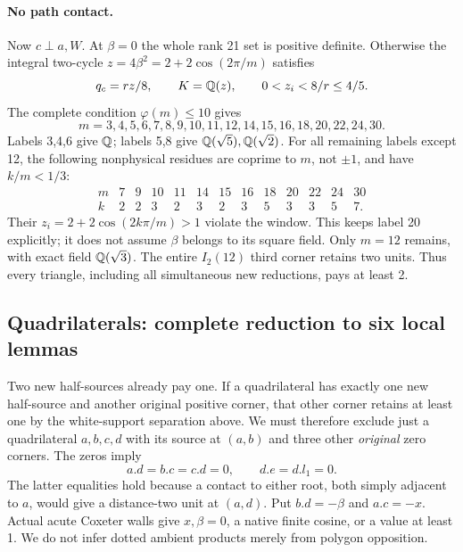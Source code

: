 \paragraph{No path contact.}
Now $c\perp a,W$. At $\beta=0$ the whole rank 21 set is positive
definite. Otherwise the integral two-cycle
$z=4\beta^2=2+2\cos(2\pi/m)$ satisfies
\[
 q_c=rz/8,\qquad K=\mathbb Q(z),\qquad 0<z_i<8/r\le4/5.
\]
The complete condition $\varphi(m)\le10$ gives
\[
 m=3,4,5,6,7,8,9,10,11,12,14,15,16,18,20,22,24,30.
\]
Labels 3,4,6 give $\mathbb Q$; labels 5,8 give
$\mathbb Q(\sqrt5),\mathbb Q(\sqrt2)$. For all remaining labels except 12,
the following nonphysical residues are coprime to $m$, not $\pm1$,
and have $k/m<1/3$:
\[
\begin{array}{c|rrrrrrrrrrrr}
m&7&9&10&11&14&15&16&18&20&22&24&30\\
k&2&2&3&2&3&2&3&5&3&3&5&7.
\end{array}
\]
Their $z_i=2+2\cos(2k\pi/m)>1$ violate the window. This keeps
label 20 explicitly; it does not assume $\beta$ belongs to its
square field. Only $m=12$ remains, with exact field
$\mathbb Q(\sqrt3)$. The entire $I_2(12)$ third corner retains two
units. Thus every triangle, including all simultaneous new reductions,
pays at least 2.

\subsection{Quadrilaterals: complete reduction to six local lemmas}
Two new half-sources already pay one. If a quadrilateral has exactly
one new half-source and another original positive corner, that other
corner retains at least one by the white-support separation above.
We must therefore exclude just a quadrilateral $a,b,c,d$ with its
source at $(a,b)$ and three other \emph{original} zero corners.
The zeros imply
\begin{equation}\label{eq:eight-zero}
 a.d=b.c=c.d=0,\qquad d.e=d.l_1=0.
\end{equation}
The latter equalities hold because a contact to either root, both
simply adjacent to $a$, would give a distance-two unit at $(a,d)$.
Put $b.d=-\beta$ and $a.c=-x$. Actual acute Coxeter walls give
$x,\beta=0$, a native finite cosine, or a value at least 1.
We do not infer dotted ambient products merely from polygon opposition.

